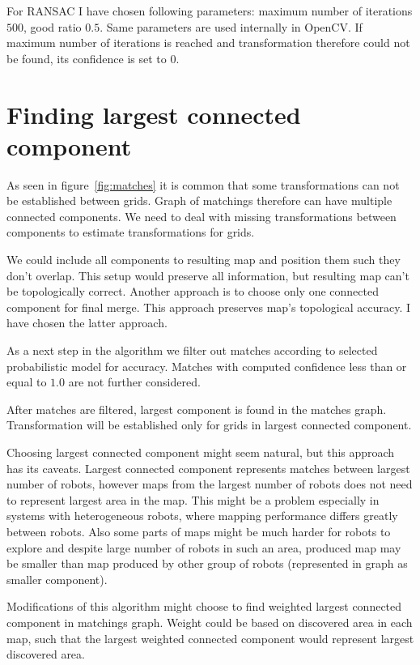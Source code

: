 For \gls{RANSAC} I have chosen following parameters: maximum number of iterations $500$, good ratio $0.5$. Same parameters are used internally in \gls{OpenCV}. If maximum number of iterations is reached and transformation therefore could not be found, its confidence is set to $0$.


\section{Finding largest connected component} %
\label{sec:findinglargestconnectedcomponent}

As seen in figure~\ref{fig:matches} it is common that some transformations can not be established between grids. Graph of matchings therefore can have multiple connected components. We need to deal with missing transformations between components to estimate transformations for grids.

We could include all components to resulting map and position them such they don't overlap. This setup would preserve all information, but resulting map can't be topologically correct. Another approach is to choose only one connected component for final merge. This approach preserves map's topological accuracy. I have chosen the latter approach.

As a next step in the algorithm we filter out matches according to selected probabilistic model for accuracy. Matches with computed confidence less than or equal to $1.0$ are not further considered.

After matches are filtered, largest component is found in the matches graph. Transformation will be established only for grids in largest connected component.

Choosing largest connected component might seem natural, but this approach has its caveats. Largest connected component represents matches between largest number of robots, however maps from the largest number of robots does not need to represent largest area in the map. This might be a problem especially in systems with heterogeneous robots, where mapping performance differs greatly between robots. Also some parts of maps might be much harder for robots to explore and despite large number of robots in such an area, produced map may be smaller than map produced by other group of robots (represented in graph as smaller component).

Modifications of this algorithm might choose to find weighted largest connected component in matchings graph. Weight could be based on discovered area in each map, such that the largest weighted connected component would represent largest discovered area.

